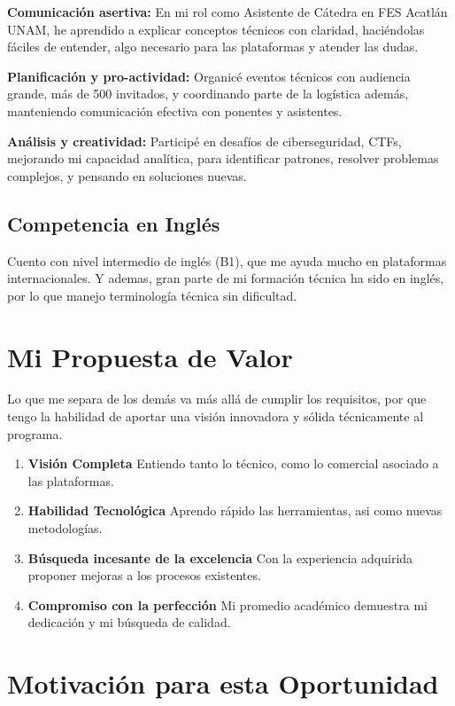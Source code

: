 \documentclass[letterpaper,11pt]{article}
\begin{document}
\textbf{Comunicación asertiva:} En mi rol como Asistente de Cátedra en FES Acatlán UNAM, he aprendido a explicar conceptos técnicos con claridad, haciéndolas fáciles de entender, algo necesario para las plataformas y atender las dudas.

\textbf{Planificación y pro-actividad:} Organicé eventos técnicos con audiencia grande, más de 500 invitados, y coordinando parte de la logística además, manteniendo comunicación efectiva con ponentes y asistentes.

\textbf{Análisis y creatividad:} Participé en desafíos de ciberseguridad, CTFs, mejorando mi capacidad analítica, para identificar patrones, resolver problemas complejos, y pensando en soluciones nuevas.

\subsection*{Competencia en Inglés}
Cuento con nivel intermedio de inglés (B1), que me ayuda mucho en plataformas internacionales. Y ademas, gran parte de mi formación técnica ha sido en inglés, por lo que manejo terminología técnica sin dificultad.

\section*{Mi Propuesta de Valor}

Lo que me separa de los demás va más allá de cumplir los requisitos, por que tengo la habilidad de aportar una visión innovadora y sólida técnicamente al programa.

\begin{enumerate}
\item \textbf{Visión Completa} Entiendo tanto lo técnico, como lo comercial asociado a las plataformas.
\item \textbf{Habilidad Tecnológica} Aprendo rápido las herramientas, asi como nuevas metodologías.
\item \textbf{Búsqueda incesante de la excelencia} Con la experiencia adquirida proponer mejoras a los procesos existentes.
\item \textbf{Compromiso con la perfección} Mi promedio académico demuestra mi dedicación y mi búsqueda de calidad.
\end{enumerate}

\section*{Motivación para esta Oportunidad}
\end{document}
